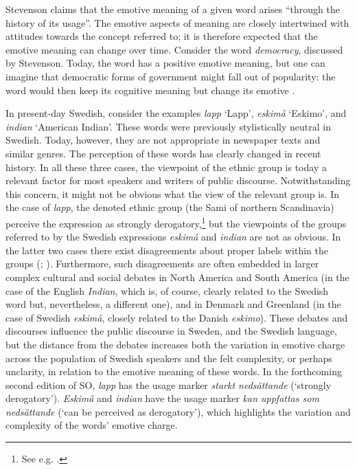 \documentclass[output=paper]{langscibook}
\begin{document}
Stevenson claims that the emotive meaning of a given word arises ``through the history of its usage''. The emotive aspects of meaning are closely intertwined with attitudes towards the concept referred to; it is therefore expected that the emotive meaning can change over time. Consider the word \emph{democracy}, discussed by Stevenson. Today, the word has a positive emotive meaning, but one can imagine that democratic forms of government might fall out of popularity: the word would then keep its cognitive meaning but change its emotive \citep[72]{stevenson1944}. 

In present-day Swedish, consider the examples \emph{lapp} `Lapp', \emph{eskimå} `Eskimo', and \emph{indian} `American Indian'. These words were previously stylistically neutral in Swedish. Today, however, they are not appropriate in newspaper texts and similar genres. The perception of these words has clearly changed in recent history. In all these three cases, the viewpoint of the ethnic group is today a relevant factor for most speakers and writers of public discourse. Notwithstanding this concern, it might not be obvious what the view of the relevant group is. In the case of \emph{lapp}, the denoted ethnic group (the Sami of northern Scandinavia) perceive the expression as strongly derogatory,\footnote{See e.g. \citet[][5]{Sametinget}.} but the viewpoints of the groups referred to by the Swedish expressions \emph{eskimå} and \emph{indian} are not as obvious. In the latter two cases there exist disagreements about proper labels within the groups (\citealt{Bird1999}; \citealt{Nationalencyklopedin}). Furthermore, such disagreements are often embedded in larger complex cultural and social debates in North America and South America (in the case of the English \emph{Indian}, which is, of course, clearly related to the Swedish word but, nevertheless, a different one), and in Denmark and Greenland (in the case of Swedish \emph{eskimå}, closely related to the Danish \emph{eskimo}). These debates and discourses influence the public discourse in Sweden, and the Swedish language, but the distance from the debates increases both the variation in emotive charge across the population of Swedish speakers and the felt complexity, or perhaps unclarity, in relation to the emotive meaning of these words. In the forthcoming second edition of SO, \emph{lapp} has the usage marker \textit{starkt nedsättande} (`strongly derogatory'). \emph{Eskimå} and \emph{indian} have the usage marker \textit{kan uppfattas som nedsättande} (`can be perceived as derogatory'), which highlights the variation and complexity of the words' emotive charge.  
\end{document}
